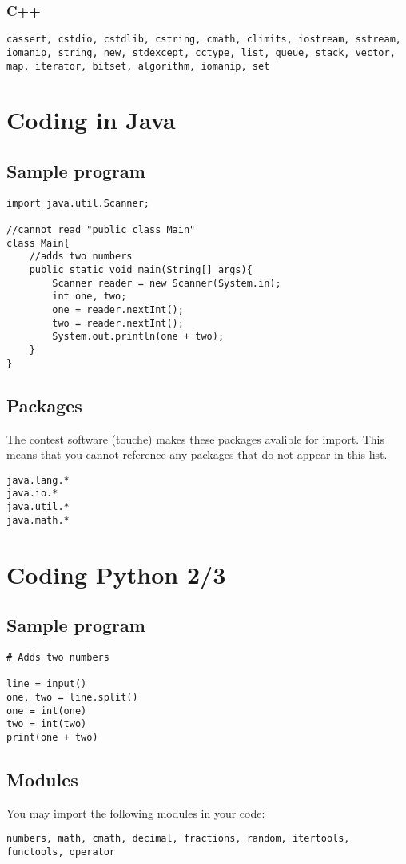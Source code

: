 \documentclass{article}
\begin{document}
	\subsubsection{C++}
	\begin{lstlisting}
cassert, cstdio, cstdlib, cstring, cmath, climits, iostream, sstream, iomanip, string, new, stdexcept, cctype, list, queue, stack, vector, map, iterator, bitset, algorithm, iomanip, set
	\end{lstlisting}
	
	\section{Coding in Java}
	\subsection{Sample program}
	\lstset{language=java}
	\begin{lstlisting}
import java.util.Scanner;

//cannot read "public class Main"
class Main{ 
	//adds two numbers
	public static void main(String[] args){
		Scanner reader = new Scanner(System.in); 
		int one, two;
		one = reader.nextInt();
		two = reader.nextInt();
		System.out.println(one + two);
	}
}
	\end{lstlisting}
	
	\subsection{Packages}
	The contest software (touche) makes these packages avalible for import. 
	This means that you cannot reference any packages that do not appear in this list.

	\begin{lstlisting}
java.lang.*
java.io.*
java.util.*
java.math.*
	\end{lstlisting}
	
	\section{Coding Python 2/3}
	\subsection{Sample program}
	\lstset{language=Python}
	\begin{lstlisting}
# Adds two numbers

line = input()
one, two = line.split()
one = int(one)
two = int(two)
print(one + two)
	\end{lstlisting}
	
	\subsection{Modules}
	You may import the following modules in your code:
	\begin{lstlisting}
numbers, math, cmath, decimal, fractions, random, itertools, functools, operator
	\end{lstlisting}
\end{document}
